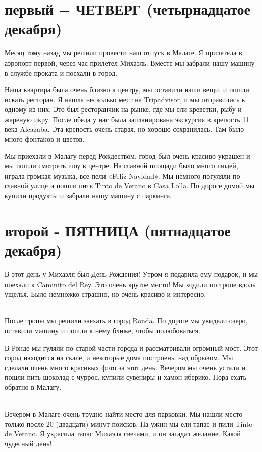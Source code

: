 \documentclass[a4paper]{article}
\begin{document}
\section{первый $-$ ЧЕТВЕРГ (четырнадцатое декабря)}
Месяц тому назад мы решили провести наш отпуск в Малаге. Я прилетела в аэропорт первой, через час прилетел Михаэль. Вместе мы забрали нашу машину в службе проката и поехали в город.
\begin{figure}[h]\centering
\end{figure}
Наша квартира была очень близко к центру, мы оставили наши вещи, и пошли искать ресторан. Я нашла несколько мест на Tripadvisor, и мы отправились к одному из них. Это был ресторанчик на рынке, где мы ели креветки, рыбу и жареную икру. После обеда у нас была запланирована экскурсия в крепость 11 века Alcazaba. Эта крепость очень старая, но хорошо сохранилась. Там было много фонтанов и цветов.\newpage
{}
\begin{figure}[h]\centering
\end{figure}\noindent
Мы приехали в Малагу перед Рождеством, город был очень красиво украшен и мы пошли смотреть шоу в центре. На главной площади было много людей, играла громкая музыка, все пели «Feliz Navidad». Мы немного погуляли по главной улице и пошли пить Tinto de Verano в Casa Lolla. По дороге домой мы купили продукты и забрали нашу машину с паркинга.\\
\newpage

\section{второй - ПЯТНИЦА (пятнадцатое декабря)}
В этот день у Михаэля был День Рождения! Утром я подарила ему подарок, и мы поехали к Caminito del Rey. Это очень крутое место! Мы ходили по тропе вдоль ущелья. Было немножко страшно, но очень красиво и интересно.
\begin{figure}[h!]\centering
\end{figure}\\
После тропы мы решили заехать в город Ronda. По дороге мы увидели озеро, оставили машину и пошли к нему ближе, чтобы полюбоваться.
\begin{figure}[h!]\centering
\end{figure}\newpage\noindent
В Ронде мы гуляли по старой части города и рассматривали огромный мост. Этот город находится на скале, и некоторые дома построены над обрывом. Мы сделали очень много красивых фото за этот день. Вечером мы очень устали и пошли пить шоколад с чуррос, купили сувениры и хамон иберико. Пора ехать обратно в Малагу.
\begin{figure}[h!]\centering
\end{figure}\\
Вечером в Малаге очень трудно найти место для парковки. Мы нашли место только после 20 (двадцати) минут поисков. На ужин мы ели тапас и пили Tinto de Verano. Я украсила тапас Михаэля свечами, и он загадал желание. Какой чудесный день!
\end{document}
